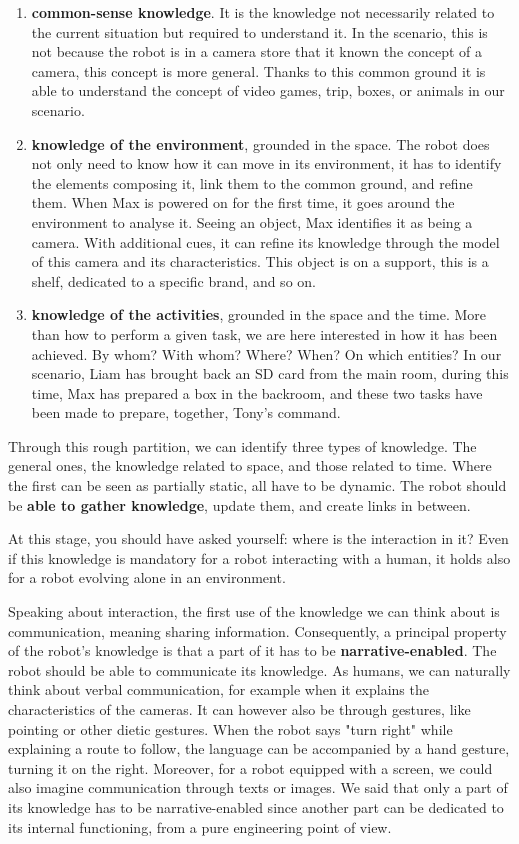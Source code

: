 \begin{enumerate}
  \item \textbf{common-sense knowledge}. It is the knowledge not necessarily related to the current situation but required to understand it. In the scenario, this is not because the robot is in a camera store that it known the concept of a camera, this concept is more general. Thanks to this common ground it is able to understand the concept of video games, trip, boxes, or animals in our scenario.
  \item \textbf{knowledge of the environment}, grounded in the space. The robot does not only need to know how it can move in its environment, it has to identify the elements composing it, link them to the common ground, and refine them. When Max is powered on for the first time, it goes around the environment to analyse it. Seeing an object, Max identifies it as being a camera. With additional cues, it can refine its knowledge through the model of this camera and its characteristics. This object is on a support, this is a shelf, dedicated to a specific brand, and so on.
  \item \textbf{knowledge of the activities}, grounded in the space and the time. More than how to perform a given task, we are here interested in how it has been achieved. By whom? With whom? Where? When? On which entities? In our scenario, Liam has brought back an SD card from the main room, during this time, Max has prepared a box in the backroom, and these two tasks have been made to prepare, together, Tony's command.
\end{enumerate}

Through this rough partition, we can identify three types of knowledge. The general ones, the knowledge related to space, and those related to time. Where the first can be seen as partially static, all have to be dynamic. The robot should be \textbf{able to gather knowledge}, update them, and create links in between.

At this stage, you should have asked yourself: where is the interaction in it? Even if this knowledge is mandatory for a robot interacting with a human, it holds also for a robot evolving alone in an environment.

Speaking about interaction, the first use of the knowledge we can think about is communication, meaning sharing information. Consequently, a principal property of the robot's knowledge is that a part of it has to be \textbf{narrative-enabled}. The robot should be able to communicate its knowledge. As humans, we can naturally think about verbal communication, for example when it explains the characteristics of the cameras. It can however also be through gestures, like pointing or other dietic gestures. When the robot says "turn right" while explaining a route to follow, the language can be accompanied by a hand gesture, turning it on the right. Moreover, for a robot equipped with a screen, we could also imagine communication through texts or images. We said that only a part of its knowledge has to be narrative-enabled since another part can be dedicated to its internal functioning, from a pure engineering point of view.

